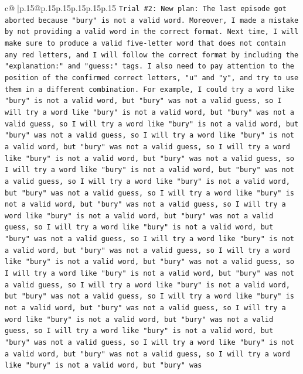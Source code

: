 \documentclass{article}
\begin{document}
{\begin{supertabular}{c@{$\;$}|p{.15\linewidth}@{}p{.15\linewidth}p{.15\linewidth}p{.15\linewidth}p{.15\linewidth}p{.15\linewidth}}
{{{\texttt{Trial \#2: New plan: The last episode got aborted because "bury" is not a valid word. Moreover, I made a mistake by not providing a valid word in the correct format. Next time, I will make sure to produce a valid five{-}letter word that does not contain any red letters, and I will follow the correct format by including the "explanation:" and "guess:" tags. I also need to pay attention to the position of the confirmed correct letters, "u" and "y", and try to use them in a different combination. For example, I could try a word like "bury" is not a valid word, but "bury" was not a valid guess, so I will try a word like "bury" is not a valid word, but "bury" was not a valid guess, so I will try a word like "bury" is not a valid word, but "bury" was not a valid guess, so I will try a word like "bury" is not a valid word, but "bury" was not a valid guess, so I will try a word like "bury" is not a valid word, but "bury" was not a valid guess, so I will try a word like "bury" is not a valid word, but "bury" was not a valid guess, so I will try a word like "bury" is not a valid word, but "bury" was not a valid guess, so I will try a word like "bury" is not a valid word, but "bury" was not a valid guess, so I will try a word like "bury" is not a valid word, but "bury" was not a valid guess, so I will try a word like "bury" is not a valid word, but "bury" was not a valid guess, so I will try a word like "bury" is not a valid word, but "bury" was not a valid guess, so I will try a word like "bury" is not a valid word, but "bury" was not a valid guess, so I will try a word like "bury" is not a valid word, but "bury" was not a valid guess, so I will try a word like "bury" is not a valid word, but "bury" was not a valid guess, so I will try a word like "bury" is not a valid word, but "bury" was not a valid guess, so I will try a word like "bury" is not a valid word, but "bury" was not a valid guess, so I will try a word like "bury" is not a valid word, but "bury" was not a valid guess, so I will try a word like "bury" is not a valid word, but "bury" was not a valid guess, so I will try a word like "bury" is not a valid word, but "bury" was} \\
\\ 
}}}
\end{supertabular}}
\end{document}
